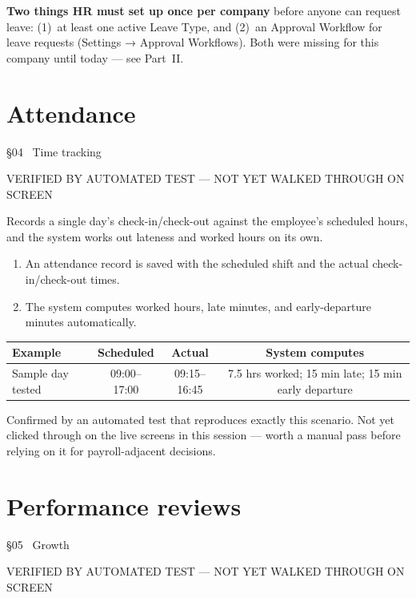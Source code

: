 \documentclass[11pt,a4paper]{article}
\newcommand{\eyebrow}[1]{{\small\ttfamily\color{accentdark} #1}\par\vspace{2pt}}
\begin{document}
\begin{note}
\textbf{Two things HR must set up once per company} before anyone can request leave: (1)~at least one active Leave Type, and (2)~an Approval Workflow for leave requests (Settings → Approval Workflows). Both were missing for this company until today --- see Part~II.
\end{note}

\section{Attendance}
\eyebrow{\S04 \textperiodcentered\ Time tracking}
\begin{statusbox}{VERIFIED BY AUTOMATED TEST --- NOT YET WALKED THROUGH ON SCREEN}\end{statusbox}

Records a single day's check-in/check-out against the employee's scheduled hours, and the system works out lateness and worked hours on its own.

\begin{enumerate}[leftmargin=1.8em]
  \item An attendance record is saved with the scheduled shift and the actual check-in/check-out times.
  \item The system computes worked hours, late minutes, and early-departure minutes automatically.
\end{enumerate}

\begin{center}
\small
\begin{tabular}{@{}lccc@{}}
\toprule
\textbf{Example} & \textbf{Scheduled} & \textbf{Actual} & \textbf{System computes} \\
\midrule
Sample day tested & 09:00--17:00 & 09:15--16:45 & 7.5 hrs worked; 15 min late; 15 min early departure \\
\bottomrule
\end{tabular}
\end{center}

\begin{note}
Confirmed by an automated test that reproduces exactly this scenario. Not yet clicked through on the live screens in this session --- worth a manual pass before relying on it for payroll-adjacent decisions.
\end{note}

\section{Performance reviews}
\eyebrow{\S05 \textperiodcentered\ Growth}
\begin{statusbox}{VERIFIED BY AUTOMATED TEST --- NOT YET WALKED THROUGH ON SCREEN}\end{statusbox}
\end{document}
